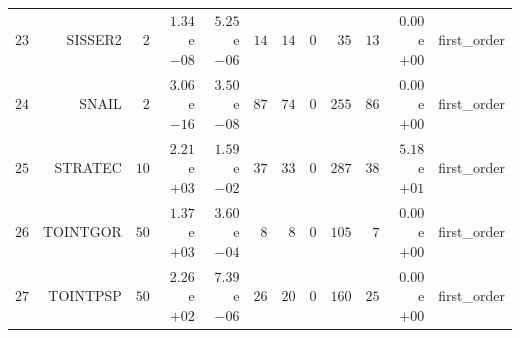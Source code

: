 \begin{longtable}{rrrrrrrrrrrr}
  \(    23\) & SISSER2 & \(     2\) & \( 1.34\)e\(-08\) & \( 5.25\)e\(-06\) & \(    14\) & \(    14\) & \(     0\) & \(    35\) & \(    13\) & \( 0.00\)e\(+00\) & first\_order \\
  \(    24\) & SNAIL & \(     2\) & \( 3.06\)e\(-16\) & \( 3.50\)e\(-08\) & \(    87\) & \(    74\) & \(     0\) & \(   255\) & \(    86\) & \( 0.00\)e\(+00\) & first\_order \\
  \(    25\) & STRATEC & \(    10\) & \( 2.21\)e\(+03\) & \( 1.59\)e\(-02\) & \(    37\) & \(    33\) & \(     0\) & \(   287\) & \(    38\) & \( 5.18\)e\(+01\) & first\_order \\
  \(    26\) & TOINTGOR & \(    50\) & \( 1.37\)e\(+03\) & \( 3.60\)e\(-04\) & \(     8\) & \(     8\) & \(     0\) & \(   105\) & \(     7\) & \( 0.00\)e\(+00\) & first\_order \\
  \(    27\) & TOINTPSP & \(    50\) & \( 2.26\)e\(+02\) & \( 7.39\)e\(-06\) & \(    26\) & \(    20\) & \(     0\) & \(   160\) & \(    25\) & \( 0.00\)e\(+00\) & first\_order \\\hline
\end{longtable}
